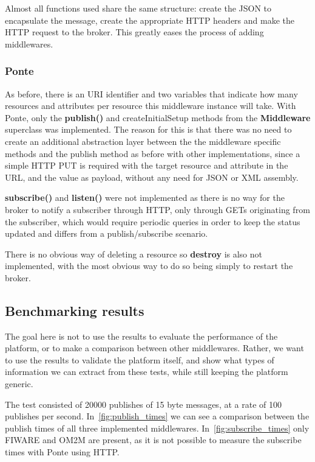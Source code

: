 \documentclass[conference]{IEEEtran}
\begin{document}
Almost all functions used share the same structure: create the JSON to encapsulate the message, create the appropriate HTTP headers and make the HTTP request to the broker. This greatly eases the process of adding middlewares.

\subsubsection{Ponte}

As before, there is an URI identifier and two variables that indicate how many resources and attributes per resource this middleware instance will take. With Ponte, only the \textbf{publish()} and createInitialSetup methods from the \textbf{Middleware} superclass was implemented. The reason for this is that there was no need to create an additional abstraction layer between the the middleware specific methods and the publish method as before with other implementations, since a simple HTTP PUT is required with the target resource and attribute in the URL, and the value as payload, without any need for JSON or XML assembly.

\textbf{subscribe()} and \textbf{listen()} were not implemented as there is no way for the broker to notify a subscriber through HTTP, only through GETs originating from the subscriber, which would require periodic queries in order to keep the status updated and differs from a publish/subscribe scenario.

There is no obvious way of deleting a resource so \textbf{destroy} is also not implemented, with the most obvious way to do so being simply to restart the broker. 

\subsection{Benchmarking results}

The goal here is not to use the results to evaluate the performance of the platform, or to make a comparison between other middlewares. Rather, we want to use the results to validate the platform itself, and show what types of information we can extract from these tests, while still keeping the platform generic.

The test consisted of 20000 publishes of 15 byte messages, at a rate of 100 publishes per second. In~\ref{fig:publish_times} we can see a comparison between the publish times of all three implemented middlewares. In~\ref{fig:subscribe_times} only FIWARE and OM2M are present, as it is not possible to measure the subscribe times with Ponte using HTTP. 
\end{document}
